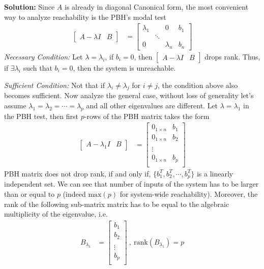 \documentclass[twoside]{article}
\begin{document}
\textbf{Solution:} Since $A$ is already in diagonal Canonical 
form, the most convenient way to analyze reachability is the PBH's modal
test 
%
\begin{align*}
  \left[ \begin{array}{c|c} A - \lambda I & B \end{array} \right]
  &= \left[ \begin{array}{ccc|c} 
  \lambda_1 & & 0 & b_1 \\
    & \ddots &
    \\
    0 & &  \lambda_n & b_n \end{array} \right]
\end{align*}
%
\textit{Necessary Condition:} Let $\lambda = \lambda_i$, if $b_i = 0$,
then $\left[ \begin{array}{c|c} A - \lambda I & B \end{array} \right]$
drops rank. Thus, if $\exists \lambda_i$ such that $b_i = 0$, then the system 
is unreachable. 

\textit{Sufficient Condition:} Not that if $\lambda_i \neq \lambda_j$ for $i \neq j$,
the condition above also becomes sufficient. Now analyze the general case, without loss 
of generality let's assume $\lambda_1 = \lambda_2 = \cdots = \lambda_p$ and all other 
eigenvalues are different. Let $\lambda = \lambda_1$ in the PBH test, then first $p$-rows of the
PBH matrix takes the form
%
\begin{align*}
  \left[ \begin{array}{c|c} A - \lambda_1 I & B \end{array} \right]
  &= \left[ \begin{array}{c|c} 
  0_{1 \times n} & b_1 \\
  0_{1 \times n}  & b_2 \\
  \\
  \vdots
  \\
  0_{1 \times n}  & b_p \\
     \end{array} \right]
\end{align*}
%
PBH matrix does not drop rank, if and only if, $\lbrace b_1^T , b_2^T , \cdots , b_p^T \rbrace$ 
is a linearly independent set. We can see that number of inputs of the system has to be larger than 
or equal to $p$ (indeed $\mathrm{max}(p)$ for system-wide reachability). Moreover, the rank of the 
following sub-matrix matrix has to be equal to the algebraic multiplicity of the eigenvalue, i.e.
%
\begin{align*}
  B_{\lambda_1}
  &= \left[ \begin{array}{c} 
  b_1 \\
   b_2 \\
  \\
  \vdots
  \\
   b_p \\
     \end{array} \right] \ , \ \mathrm{rank}(B_{\lambda_1}) = p  
\end{align*}
%



\end{document}

